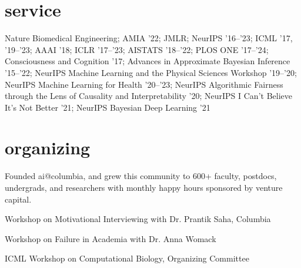 \documentclass[4pt, letterpaper]{article}
\begin{document}
\clearpage
\section*{service}
Nature Biomedical Engineering; AMIA '22; JMLR; NeurIPS '16--'23; ICML '17, '19--'23; AAAI '18; ICLR '17--'23; AISTATS '18--'22; PLOS ONE '17--'24; Consciousness and Cognition '17; Advances in Approximate Bayesian Inference '15--'22; NeurIPS Machine Learning and the Physical Sciences Workshop '19--'20; NeurIPS Machine Learning for Health '20--'23; NeurIPS Algorithmic Fairness through the Lens of Causality and Interpretability '20; NeurIPS I Can't Believe It's Not Better '21; NeurIPS Bayesian Deep Learning '21

\section*{organizing}

Founded ai@columbia, and grew this community to 600+ faculty, postdocs, undergrads, and researchers with monthly happy hours sponsored by venture capital. 

Workshop on Motivational Interviewing with Dr. Prantik Saha, Columbia

Workshop on Failure in Academia with Dr. Anna Womack

ICML Workshop on Computational Biology, Organizing Committee
\end{document}
